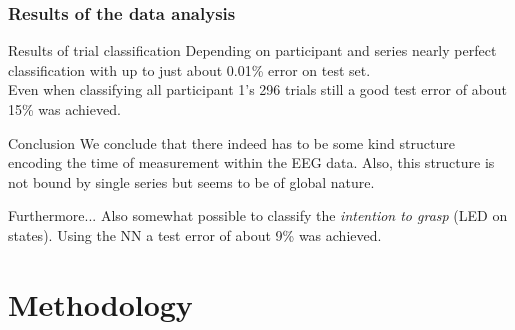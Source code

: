 \documentclass{beamer}
\begin{document}
\begin{frame}
	\frametitle{Results of the data analysis}
	
	\begin{block}{Results of trial classification}
		Depending on participant and series nearly perfect classification with up to just about 0.01\% error on test set.\\
		Even when classifying all participant 1's 296 trials still a good test error of about 15\% was achieved.
	\end{block}
	
	\begin{block}{Conclusion}
		We conclude that there indeed has to be some kind structure encoding the time of measurement within the EEG data.
		Also, this structure is not bound by single series but seems to be of global nature.
	\end{block}
	
	\begin{block}{Furthermore...}
		Also somewhat possible to classify the \emph{intention to grasp} (LED on states). Using the NN a test error of about 9\% was achieved.
	\end{block}
\end{frame}



\section{Methodology}
\end{document}
